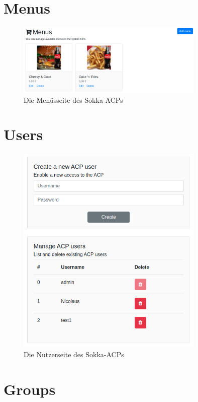 \section{Menus}

\begin{figure}[ht]
    \centering
    \includegraphics[width=0.8\textwidth]{images/ACP/menus.png}
    \caption{Die Menüsseite des Sokka-ACPs}
\end{figure}

\section{Users}

\begin{figure}[ht]
    \centering
    \includegraphics[width=0.8\textwidth]{images/ACP/users.png}
    \caption{Die Nutzerseite des Sokka-ACPs}
\end{figure}

\section{Groups}

